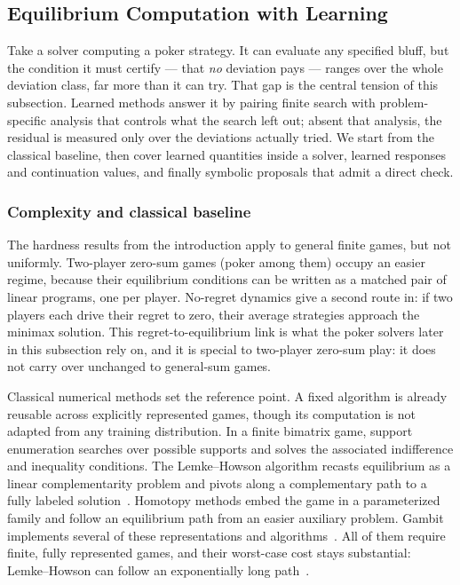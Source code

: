 \subsection{Equilibrium Computation with Learning}
\label{sec:ai4gt:equilibrium}

Take a solver computing a poker strategy. It can evaluate any specified bluff, but
the condition it must certify --- that \emph{no}
deviation pays --- ranges over the whole deviation class, far more than it can try.
That gap is the central tension of this subsection. Learned methods answer it by
pairing finite search with problem-specific analysis that controls what the search
left out; absent that analysis, the residual is measured only over the deviations
actually tried. We start from the classical baseline,
then cover learned quantities inside a solver, learned responses and
continuation values, and finally symbolic proposals that admit a direct check.

\subsubsection{Complexity and classical baseline}
The hardness results from the introduction apply to general finite games, but not
uniformly. Two-player zero-sum games (poker among them) occupy an easier regime, because their equilibrium conditions can be written as a matched pair of
linear programs, one per player. No-regret dynamics give a second route in: if two
players each drive their regret to zero, their average strategies approach the
minimax solution. This regret-to-equilibrium link is what the poker solvers later in
this subsection rely on, and it is special to two-player zero-sum play: it does not carry over unchanged to
general-sum games.

Classical numerical methods set the reference point. A fixed algorithm is already
reusable across explicitly represented games, though its computation is not
adapted from any training distribution. In a finite bimatrix game, support enumeration searches over possible supports
and solves the associated indifference and inequality conditions. The
Lemke--Howson algorithm recasts equilibrium as a linear complementarity
problem and pivots along a complementary path to a fully labeled
solution~\citep{LemkeHowson1964}. Homotopy methods embed the game in a
parameterized family and follow an equilibrium path from an easier auxiliary
problem. Gambit implements several of these
representations and algorithms~\citep{gambit}. All of them require finite, fully
represented games, and their worst-case cost stays substantial: Lemke--Howson can follow an
exponentially long path~\citep{SavaniVonStengel2006}.

